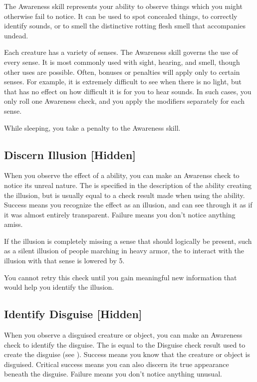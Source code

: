 \newpage
{}
    The Awareness skill represents your ability to observe things which you might otherwise fail to notice. It can be used to spot concealed things, to correctly identify sounds, or to smell the distinctive rotting flesh smell that accompanies undead.

    Each creature has a variety of senses. The Awareness skill governs the use of every sense. It is most commonly used with sight, hearing, and smell, though other uses are possible. Often, bonuses or penalties will apply only to certain senses. For example, it is extremely difficult to see when there is no light, but that has no effect on how difficult it is for you to hear sounds. In such cases, you only roll one Awareness check, and you apply the modifiers separately for each sense.

    While sleeping, you take a  penalty to the Awareness skill.

    \subsection{Discern Illusion [Hidden]}
        When you observe the effect of a  ability, you can make an Awarenss check to notice its unreal nature.
        The  is specified in the description of the ability creating the illusion, but is usually equal to a check result made when using the ability.
        Success means you recognize the effect as an illusion, and can see through it as if it was almost entirely transparent.
        Failure means you don't notice anything amiss.

        If the illusion is completely missing a sense that should logically be present, such as a silent illusion of people marching in heavy armor, the  to interact with the illusion with that sense is lowered by 5.

        You cannot retry this check until you gain meaningful new information that would help you identify the illusion.

    \subsection{Identify Disguise [Hidden]}\label{Identify Disguise}
        When you observe a disguised creature or object, you can make an Awareness check to identify the disguise.
        The  is equal to the Disguise check result used to create the disguise (see ).
        Success means you know that the creature or object is disguised.
        Critical success means you can also discern its true appearance beneath the disguise.
        Failure means you don't notice anything unusual.

